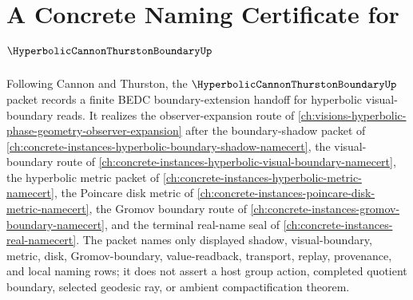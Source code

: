 \chapter{A Concrete Naming Certificate for $\HyperbolicCannonThurstonBoundaryUp$}
\label{ch:concrete-instances-hyperbolic-cannon-thurston-boundary-namecert}

Following Cannon and Thurston, the $\HyperbolicCannonThurstonBoundaryUp$ packet records a finite BEDC boundary-extension handoff for hyperbolic visual-boundary reads. It realizes the observer-expansion route of \autoref{ch:visions-hyperbolic-phase-geometry-observer-expansion} after the boundary-shadow packet of \autoref{ch:concrete-instances-hyperbolic-boundary-shadow-namecert}, the visual-boundary route of \autoref{ch:concrete-instances-hyperbolic-visual-boundary-namecert}, the hyperbolic metric packet of \autoref{ch:concrete-instances-hyperbolic-metric-namecert}, the Poincare disk metric of \autoref{ch:concrete-instances-poincare-disk-metric-namecert}, the Gromov boundary route of \autoref{ch:concrete-instances-gromov-boundary-namecert}, and the terminal real-name seal of \autoref{ch:concrete-instances-real-namecert}. The packet names only displayed shadow, visual-boundary, metric, disk, Gromov-boundary, value-readback, transport, replay, provenance, and local naming rows; it does not assert a host group action, completed quotient boundary, selected geodesic ray, or ambient compactification theorem.

